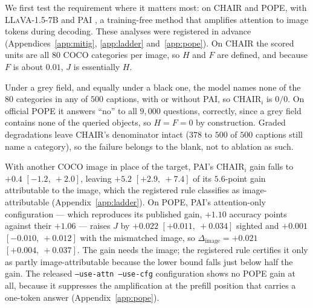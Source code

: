 \documentclass{article} %
\newcommand{\dSight}{\ensuremath{\Delta_{\mathrm{image}}}}
\newcommand{\civ}[2]{$[#1,\ #2]$}
\begin{document}
We first test the requirement where it matters most: on CHAIR and POPE, with \textsc{LLaVA-1.5-7B} and
PAI \citep{pai}, a training-free method that amplifies attention to image tokens during decoding. These
analyses were registered in advance (Appendices~\ref{app:mitig}, \ref{app:ladder} and~\ref{app:pope}).
On CHAIR the scored units are all $80$ COCO categories per image, so $H$ and $F$ are defined, and
because $F$ is about $0.01$, $J$ is essentially $H$.

Under a grey field, and equally under a black one, the model names
none of the $80$ categories in any of $500$ captions, with or without PAI, so $\mathrm{CHAIR}_i$ is
$0/0$. On official POPE it answers ``no'' to all $9{,}000$ questions, correctly, since a grey field
contains none of the queried objects, so $H = F = 0$ by construction. Graded degradations leave CHAIR's
denominator intact ($378$ to $500$ of $500$ captions still name a category), so the failure belongs to
the blank, not to ablation as such.

With another COCO image in
place of the target, PAI's $\mathrm{CHAIR}_i$ gain falls to $+0.4$ \civ{-1.2}{+2.0}, leaving $+5.2$
\civ{+2.9}{+7.4} of its $5.6$-point gain attributable to the image, which the registered rule classifies
as image-attributable (Appendix~\ref{app:ladder}). On POPE, PAI's attention-only configuration ---
which reproduces its published gain, $+1.10$ accuracy points against their $+1.06$ --- raises $J$ by
$+0.022$ \civ{+0.011}{+0.034} sighted and $+0.001$ \civ{-0.010}{+0.012} with the mismatched image, so
$\dSight = +0.021$ \civ{+0.004}{+0.037}. The gain needs the image; the registered rule certifies it
only as partly image-attributable because the lower bound falls just below half the gain. The released
\texttt{--use-attn --use-cfg} configuration shows no POPE gain at all, because it suppresses the
amplification at the prefill position that carries a one-token answer (Appendix~\ref{app:pope}).
\end{document}
